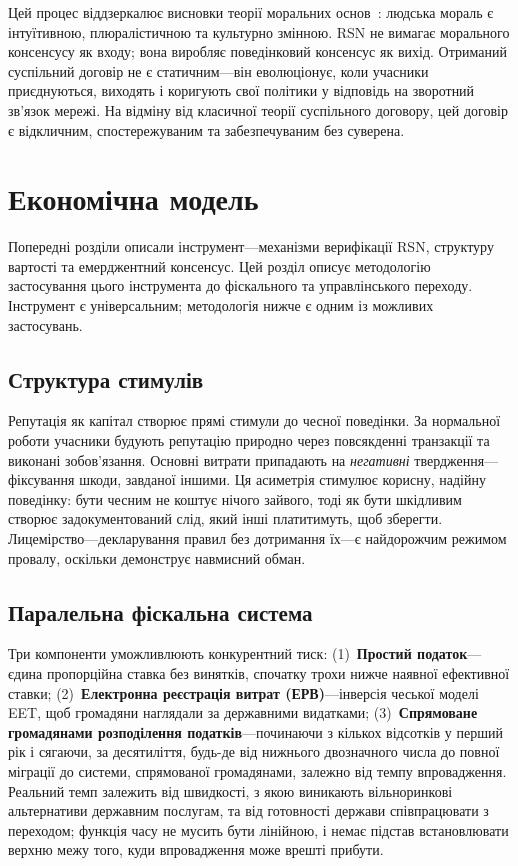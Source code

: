 \documentclass[11pt,a4paper,twocolumn]{article}
\begin{document}
Цей процес віддзеркалює висновки теорії моральних основ~\cite{haidt2012}: людська мораль є інтуїтивною, плюралістичною та культурно змінною. RSN не вимагає морального консенсусу як входу; вона виробляє поведінковий консенсус як вихід. Отриманий суспільний договір не є статичним---він еволюціонує, коли учасники приєднуються, виходять і коригують свої політики у відповідь на зворотний зв'язок мережі. На відміну від класичної теорії суспільного договору, цей договір є відкличним, спостережуваним та забезпечуваним без суверена.

\section{Економічна модель}

Попередні розділи описали інструмент---механізми верифікації RSN, структуру вартості та емерджентний консенсус. Цей розділ описує методологію застосування цього інструмента до фіскального та управлінського переходу. Інструмент є універсальним; методологія нижче є одним із можливих застосувань.

\subsection{Структура стимулів}

Репутація як капітал створює прямі стимули до чесної поведінки. За нормальної роботи учасники будують репутацію природно через повсякденні транзакції та виконані зобов'язання. Основні витрати припадають на \emph{негативні} твердження---фіксування шкоди, завданої іншими. Ця асиметрія стимулює корисну, надійну поведінку: бути чесним не коштує нічого зайвого, тоді як бути шкідливим створює задокументований слід, який інші платитимуть, щоб зберегти. Лицемірство---декларування правил без дотримання їх---є найдорожчим режимом провалу, оскільки демонструє навмисний обман.

\subsection{Паралельна фіскальна система}

Три компоненти уможливлюють конкурентний тиск: (1)~\textbf{Простий податок}---єдина пропорційна ставка без винятків, спочатку трохи нижче наявної ефективної ставки; (2)~\textbf{Електронна реєстрація витрат (ЕРВ)}---інверсія чеської моделі EET, щоб громадяни наглядали за державними видатками; (3)~\textbf{Спрямоване громадянами розподілення податків}---починаючи з кількох відсотків у перший рік і сягаючи, за десятиліття, будь-де від нижнього двозначного числа до повної міграції до системи, спрямованої громадянами, залежно від темпу впровадження. Реальний темп залежить від швидкості, з якою виникають вільноринкові альтернативи державним послугам, та від готовності держави співпрацювати з переходом; функція часу не мусить бути лінійною, і немає підстав встановлювати верхню межу того, куди впровадження може врешті прибути.
\end{document}
